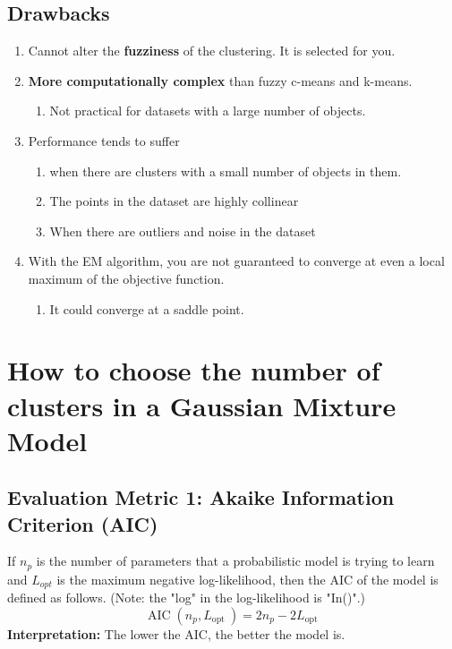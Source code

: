 \documentclass[11pt]{elegantbook}
\begin{document}
\subsection*{Drawbacks}
\begin{enumerate}[$\bullet$]
    \item Cannot alter the \textbf{fuzziness} of the clustering. It is selected for you.
    \item \textbf{More computationally complex} than fuzzy c-means and k-means.
    \begin{enumerate}[$\circ$]
        \item Not practical for datasets with a large number of objects.
    \end{enumerate}
    \item Performance tends to suffer
    \begin{enumerate}[$\circ$]
        \item when there are clusters with a small number of objects in them.
        \item The points in the dataset are highly collinear
        \item When there are outliers and noise in the dataset
    \end{enumerate}
    \item With the EM algorithm, you are not guaranteed to converge at even a local maximum of the objective function.
    \begin{enumerate}[$\circ$]
        \item It could converge at a saddle point.
    \end{enumerate}
\end{enumerate}



\section{How to choose the number of clusters in a Gaussian Mixture Model}
\subsection{Evaluation Metric 1: Akaike Information Criterion (AIC)}
If $n_p$ is the number of parameters that a probabilistic model is trying to learn and $L_{o p t}$ is the maximum negative log-likelihood, then the AIC of the model is defined as follows. (Note: the "log" in the log-likelihood is "In()".)
$$
\operatorname{AIC}\left(n_p, L_{\text {opt }}\right)=2 n_p-2 L_{\text {opt }}
$$
\textbf{Interpretation:} The lower the AIC, the better the model is.
\end{document}
